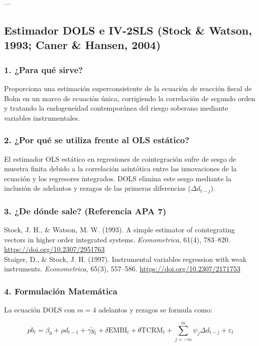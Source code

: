 \documentclass[11pt,a4paper]{article}
\begin{document}
---

\subsection{Estimador DOLS e IV-2SLS (Stock \& Watson, 1993; Caner \& Hansen, 2004)}

\subsubsection{1. ¿Para qué sirve?}
Proporciona una estimación superconsistente de la ecuación de reacción fiscal de Bohn en un marco de ecuación única, corrigiendo la correlación de segundo orden y tratando la endogeneidad contemporánea del riesgo soberano mediante variables instrumentales.

\subsubsection{2. ¿Por qué se utiliza frente al OLS estático?}
El estimador OLS estático en regresiones de cointegración sufre de sesgo de muestra finita debido a la correlación asintótica entre las innovaciones de la ecuación y los regresores integrados. DOLS elimina este sesgo mediante la inclusión de adelantos y rezagos de las primeras diferencias ($\Delta d_{t-j}$).

\subsubsection{3. ¿De dónde sale? (Referencia APA 7)}
\begin{mdframed}[style=apabox]
Stock, J. H., \& Watson, M. W. (1993). A simple estimator of cointegrating vectors in higher order integrated systems. \textit{Econometrica}, 61(4), 783--820. \url{https://doi.org/10.2307/2951763}\\
Staiger, D., \& Stock, J. H. (1997). Instrumental variables regression with weak instruments. \textit{Econometrica}, 65(3), 557--586. \url{https://doi.org/10.2307/2171753}
\end{mdframed}

\subsubsection{4. Formulación Matemática}
La ecuación DOLS con $m=4$ adelantos y rezagos se formula como:

\begin{equation}
pb_t = \beta_0 + \rho d_{t-1} + \gamma \tilde{y}_t + \delta \text{EMBI}_t + \theta \text{TCRM}_t + \sum_{j=-m}^{m} \psi_j \Delta d_{t-j} + \varepsilon_t
\end{equation}
\end{document}
